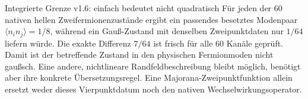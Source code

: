 \begin{grenze}{Integrierte Grenze v1.6: einfach bedeutet nicht quadratisch}
Für jeden der 60 nativen hellen Zweifermionenzustände ergibt ein passendes besetztes Modenpaar $\langle n_i n_j\rangle=1/8$, während ein Gauß-Zustand mit denselben Zweipunktdaten nur $1/64$ liefern würde. Die exakte Differenz $7/64$ ist frisch für alle 60 Kanäle geprüft. Damit ist der betreffende Zustand in den physischen Fermionmoden nicht gaußsch. Eine andere, nichtlineare Randfeldbeschreibung bleibt möglich, benötigt aber ihre konkrete Übersetzungsregel. Eine Majorana-Zweipunktfunktion allein ersetzt weder dieses Vierpunktdatum noch den nativen Wechselwirkungsoperator.
\end{grenze}
